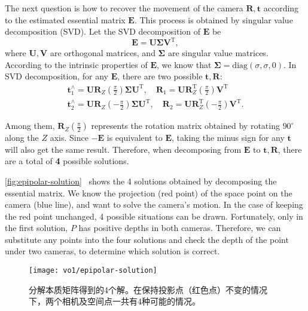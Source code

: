 The next question is how to recover the movement of the camera $\mathbf{R}, \mathbf{t}$ according to the estimated essential matrix $\mathbf{E}$. This process is obtained by singular value decomposition (SVD). Let the SVD decomposition of $\mathbf{E}$ be
\begin{equation}
\mathbf{E} = \mathbf{U} \mathbf{\Sigma} \mathbf{V}^\mathrm{T},
\end{equation}
where $\mathbf{U}, \mathbf{V}$ are orthogonal matrices, and $\mathbf{\Sigma}$ are singular value matrices. According to the intrinsic properties of $\mathbf{E}$, we know that $\mathbf{\Sigma} = \mathrm{diag}( \sigma, \sigma, 0 )$. In SVD decomposition, for any $\mathbf{E}$, there are two possible $\mathbf{t}, \mathbf{R}$:
\begin{equation}
\begin{array}{l}
\mathbf{t}_1^ \wedge  = \mathbf{U}{\mathbf{R}_Z}(\frac{\pi }{2}) \mathbf{\Sigma} {\mathbf{U}^\mathrm{T}}, \quad {\mathbf{R}_1} = \mathbf{U} \mathbf{R}_Z^\mathrm{T}(\frac{\pi }{2}){ \mathbf{V}^\mathrm{T}}\\
\mathbf{t}_2^ \wedge  = \mathbf{U}{\mathbf{R}_Z}( - \frac{\pi }{2})\mathbf{\Sigma} {\mathbf{U}^\mathrm{T}}, \quad  {\mathbf{R}_2} = \mathbf{U} \mathbf{R}_Z^\mathrm{T}( - \frac{\pi }{2}){\mathbf{V}^\mathrm{T}}.
\end{array}
\end{equation}

Among them, $\mathbf{R}_Z\left(\frac{\pi }{2}\right)$ represents the rotation matrix obtained by rotating $90^\circ$ along the $Z$ axis. Since $-\mathbf{E}$ is equivalent to $\mathbf{E}$, taking the minus sign for any $\mathbf{t}$ will also get the same result. Therefore, when decomposing from $\mathbf{E}$ to $\mathbf{t}, \mathbf{R}$, there are a total of \textbf{4} possible solutions.

\autoref{fig:epipolar-solution}~ shows the 4 solutions obtained by decomposing the essential matrix. We know the projection (red point) of the space point on the camera (blue line), and want to solve the camera's motion. In the case of keeping the red point unchanged, 4 possible situations can be drawn. Fortunately, only in the first solution, $P$ has positive depths in both cameras. Therefore, we can substitute any points into the four solutions and check the depth of the point under two cameras, to determine which solution is correct.

\begin{figure}[!htp]
	\centering
	\texttt{[image: vo1/epipolar-solution]}
	\caption{分解本质矩阵得到的4个解。在保持投影点（红色点）不变的情况下，两个相机及空间点一共有4种可能的情况。}
	\label{fig:epipolar-solution}
\end{figure}

